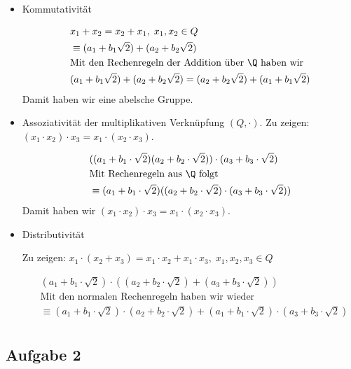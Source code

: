 \begin{itemize}
 \item Kommutativität

  \begin{align*}
    &x_1 + x_2 = x_2 + x_1, \; x_1, x_2 \in Q \\
    &\equiv (a_1 + b_1 \sqrt{2}) + (a_2 + b_2 \sqrt{2})\\
    & \text{Mit den Rechenregeln der Addition über $\Q$ haben wir} \\
    & (a_1 + b_1 \sqrt{2}) + (a_2 + b_2 \sqrt{2}) = (a_2 + b_2 \sqrt{2}) + (a_1 + b_1 \sqrt{2}) \\
  \end{align*}
  Damit haben wir eine abelsche Gruppe.

  \item Assoziativität der multiplikativen Verknüpfung $(Q, \cdot)$. Zu zeigen: $(x_1 \cdot x_2) \cdot x_3 = x_1 \cdot (x_2 \cdot x_3)$.

  \begin{align*}
  &((a_1 + b_1 \cdot \sqrt{2}) (a_2 + b_2 \cdot \sqrt{2})) \cdot (a_3  + b_3 \cdot \sqrt{2}) \\
    &\text{Mit Rechenregeln aus $\Q$ folgt}\\
    &\equiv (a_1 + b_1 \cdot \sqrt{2}) ((a_2 + b_2 \cdot \sqrt{2}) \cdot (a_3  + b_3 \cdot \sqrt{2}))
  \end{align*}
  Damit haben wir $(x_1 \cdot x_2) \cdot x_3 = x_1 \cdot (x_2 \cdot x_3)$.
  \item Distributivität

  Zu zeigen: $  x_1 \cdot (x_2 + x_3) = x_1 \cdot x_2 + x_1 \cdot x_3 , \; x_1, x_2, x_3 \in Q $

  \begin{align*}
    &(a_1 + b_1 \cdot \sqrt{2}) \cdot ((a_2 + b_2 \cdot \sqrt{2})+(a_3 + b_3 \cdot \sqrt{2} )) \\
    &\text{Mit den normalen Rechenregeln haben wir wieder} \\
    &\equiv (a_1 + b_1\cdot\sqrt{2})\cdot(a_2 + b_2 \cdot \sqrt{2}) +
      (a_1 + b_1 \cdot \sqrt{2}) \cdot (a_3 + b_3 \cdot \sqrt{2})\\
  \end{align*}


\end{itemize}

\subsection*{Aufgabe 2}


